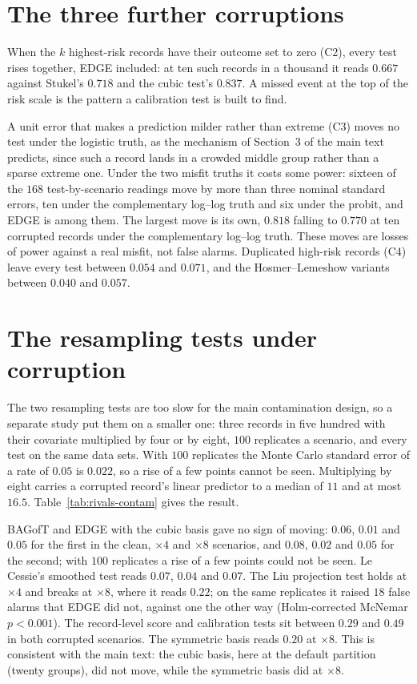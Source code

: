 \documentclass[11pt]{article}
\begin{document}
\section{The three further corruptions}\label{si:c2}

When the $k$ highest-risk records have their outcome set to zero (C2), every test rises together, 
EDGE included: at ten such records in a thousand it reads $0.667$ against Stukel's $0.718$
and the cubic test's $0.837$. A missed event at the top of the risk scale is the pattern a
calibration test is built to find.

A unit error that makes a prediction milder rather than extreme (C3) moves no test under the logistic
truth, as the mechanism of Section~3 of the main text predicts, since such a record lands in a crowded
middle group rather than a sparse extreme one. Under the two misfit truths it costs some power:
sixteen of the $168$ test-by-scenario readings move by more than three nominal standard errors, ten
under the complementary log--log truth and six under the probit, and EDGE is among them.
The largest move is its own, $0.818$ falling to $0.770$ at ten corrupted records under the
complementary log--log truth. These moves are losses of power against a real misfit, not false
alarms. Duplicated high-risk records (C4) leave every test between $0.054$ and $0.071$, and the
Hosmer--Lemeshow variants between $0.040$ and $0.057$.

\section{The resampling tests under corruption}\label{si:rivals}

The two resampling tests are too slow for the main contamination design, so a separate study put them
on a smaller one: three records in five hundred with their covariate multiplied by four or by eight,
$100$ replicates a scenario, and every test on the same data sets. With $100$ replicates the Monte
Carlo standard error of a rate of $0.05$ is $0.022$, so a rise of a few points cannot be seen. Multiplying by eight carries a
corrupted record's linear predictor to a median of $11$ and at most $16.5$.
Table~\ref{tab:rivals-contam} gives the result.

BAGofT and EDGE with the cubic basis gave no sign of moving: $0.06$, $0.01$ and $0.05$ for
the first in the clean, $\times4$ and $\times8$ scenarios, and $0.08$, $0.02$ and $0.05$ for the second;
with $100$ replicates a rise of a few points could not be seen. Le Cessie's smoothed test reads $0.07$, $0.04$ and $0.07$. The Liu projection test holds at
$\times4$ and breaks at $\times8$, where it reads $0.22$; on the same replicates it raised $18$ false
alarms that EDGE did not, against one the other way (Holm-corrected McNemar $p<0.001$).
The record-level score and calibration tests sit between $0.29$ and $0.49$ in both corrupted
scenarios. The symmetric basis reads $0.20$ at $\times8$. This is consistent with the main text: the
cubic basis, here at the default partition (twenty groups), did not move, while the symmetric basis
did at $\times8$.
\end{document}

